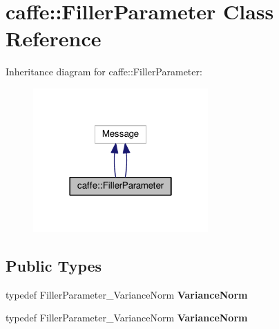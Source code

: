 \hypertarget{classcaffe_1_1_filler_parameter}{}\section{caffe\+:\+:Filler\+Parameter Class Reference}
\label{classcaffe_1_1_filler_parameter}


Inheritance diagram for caffe\+:\+:Filler\+Parameter\+:
\nopagebreak
\begin{figure}[H]
\begin{center}
\leavevmode
\includegraphics[width=190pt]{classcaffe_1_1_filler_parameter__inherit__graph}
\end{center}
\end{figure}
\subsection*{Public Types}
\begin{DoxyCompactItemize}
\item 
\mbox{\label{classcaffe_1_1_filler_parameter_ab91fdbf6dfdab62850aba65e6c849528}} 
typedef Filler\+Parameter\+\_\+\+Variance\+Norm {\bfseries Variance\+Norm}
\item 
\mbox{\label{classcaffe_1_1_filler_parameter_ab91fdbf6dfdab62850aba65e6c849528}} 
typedef Filler\+Parameter\+\_\+\+Variance\+Norm {\bfseries Variance\+Norm}
\end{DoxyCompactItemize}
